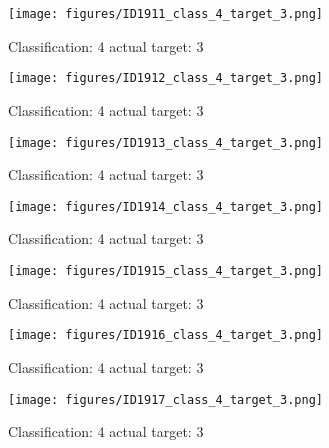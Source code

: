 \begin{figure}[h!]
\begin{center}
\texttt{[image: figures/ID1911\_class\_4\_target\_3.png]}
\end{center}
\caption{ Classification: 4 actual target: 3}
\label{fig:ID1911_class_4_target_3}
\end{figure}
\begin{figure}[h!]
\begin{center}
\texttt{[image: figures/ID1912\_class\_4\_target\_3.png]}
\end{center}
\caption{ Classification: 4 actual target: 3}
\label{fig:ID1912_class_4_target_3}
\end{figure}
\begin{figure}[h!]
\begin{center}
\texttt{[image: figures/ID1913\_class\_4\_target\_3.png]}
\end{center}
\caption{ Classification: 4 actual target: 3}
\label{fig:ID1913_class_4_target_3}
\end{figure}
\begin{figure}[h!]
\begin{center}
\texttt{[image: figures/ID1914\_class\_4\_target\_3.png]}
\end{center}
\caption{ Classification: 4 actual target: 3}
\label{fig:ID1914_class_4_target_3}
\end{figure}
\begin{figure}[h!]
\begin{center}
\texttt{[image: figures/ID1915\_class\_4\_target\_3.png]}
\end{center}
\caption{ Classification: 4 actual target: 3}
\label{fig:ID1915_class_4_target_3}
\end{figure}
\begin{figure}[h!]
\begin{center}
\texttt{[image: figures/ID1916\_class\_4\_target\_3.png]}
\end{center}
\caption{ Classification: 4 actual target: 3}
\label{fig:ID1916_class_4_target_3}
\end{figure}
\begin{figure}[h!]
\begin{center}
\texttt{[image: figures/ID1917\_class\_4\_target\_3.png]}
\end{center}
\caption{ Classification: 4 actual target: 3}
\label{fig:ID1917_class_4_target_3}
\end{figure}
